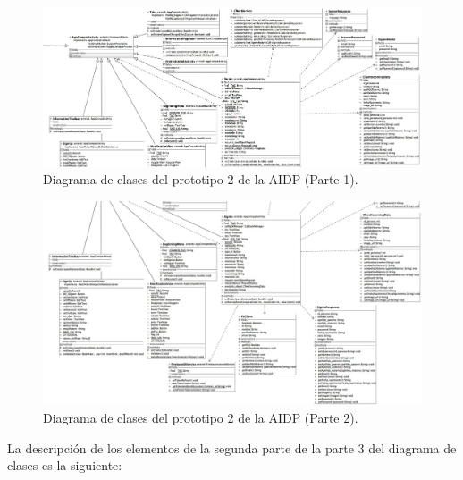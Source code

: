 \FloatBarrier
\begin{figure}[htbp!]
		\centering
			\includegraphics[width=1.1 \textwidth]{imagenes/aidp_clases/home3}
		\caption{Diagrama de clases del prototipo 2 de la AIDP (Parte 1).}
		\label{image:clases55}
\end{figure}
\FloatBarrier
\FloatBarrier
\begin{figure}[htbp!]
		\centering
			\includegraphics[width=1.1 \textwidth]{imagenes/aidp_clases/home4}
		\caption{Diagrama de clases del prototipo 2 de la AIDP (Parte 2).}
		\label{image:clases66}
\end{figure}
\FloatBarrier
La descripción de los elementos de la segunda parte de la parte 3 del diagrama de clases es la siguiente: 
